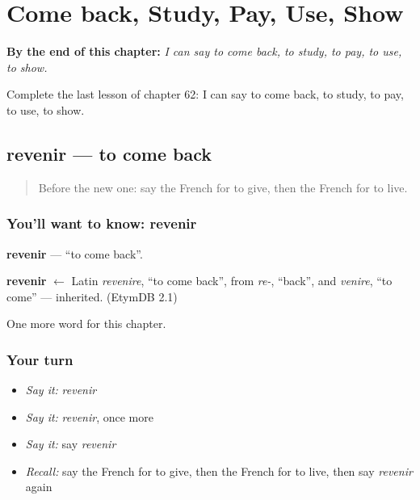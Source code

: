
\chapter{Come back, Study, Pay, Use, Show}
\label{ch:fr-come-back-study-pay-use-show}

\begin{chapteropening}
\textbf{By the end of this chapter:} \emph{I can say to come back, to study, to pay, to use, to show.}

Complete the last lesson of chapter 62: I can say to come back, to study, to pay, to use, to show.
\end{chapteropening}

\section[revenir]{revenir — to come back}

\label{lesson:FR-C62-revenir}



\begin{quote}
Before the new one: say the French for to give, then the French for to live.
\end{quote}

\subsection*{You'll want to know: revenir}
\textbf{revenir} — \textquotedblleft{}to come back\textquotedblright{}.

\begin{cousinweb}
\textbf{revenir} $\leftarrow$ Latin \emph{revenire}, \textquotedblleft{}to come back\textquotedblright{}, from \emph{re-}, \textquotedblleft{}back\textquotedblright{}, and \emph{venire}, \textquotedblleft{}to come\textquotedblright{} — inherited. (EtymDB 2.1)
\end{cousinweb}

\begin{grammarlens}[title={What you've built}]
One more word for this chapter.
\end{grammarlens}

\subsection*{Your turn}
\begin{itemize}
\raggedright
  \item \emph{Say it:} \emph{revenir}
  \item \emph{Say it:} \emph{revenir}, once more
  \item \emph{Say it:} say \emph{revenir}
  \item \emph{Recall:} say the French for to give, then the French for to live, then say \emph{revenir} again
\end{itemize}

